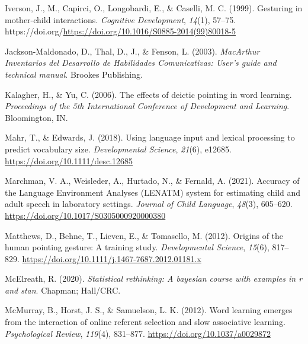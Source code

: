 \documentclass[
  man,floatsintext]{apa6}
\newlength{\cslhangindent}
\newlength{\cslentryspacingunit} %
\newenvironment{CSLReferences}[2] %
 {%
  \setlength{\parindent}{0pt}
  \ifodd #1
  \let\oldpar\par
  \def\par{\hangindent=\cslhangindent\oldpar}
  \fi
  \setlength{\parskip}{#2\cslentryspacingunit}
 }%
 {}
\begin{document}
\begin{CSLReferences}{1}{0}
\leavevmode{}%
Iverson, J., M., Capirci, O., Longobardi, E., \& Caselli, M. C. (1999). Gesturing in mother-child interactions. \emph{Cognitive Development}, \emph{14}(1), 57--75. https://doi.org/\url{https://doi.org/10.1016/S0885-2014(99)80018-5}

\leavevmode{}%
Jackson-Maldonado, D., Thal, D., J., \& Fenson, L. (2003). \emph{{MacArthur} {Inventarios} del {Desarrollo} de {Habilidades} {Comunicativas}: {User}'s guide and technical manual}. Brookes Publishing.

\leavevmode{}%
Kalagher, H., \& Yu, C. (2006). The effects of deictic pointing in word learning. \emph{Proceedings of the 5th {International} {Conference} of {Development} and {Learning}}. Bloomington, IN.

\leavevmode{}%
Mahr, T., \& Edwards, J. (2018). Using language input and lexical processing to predict vocabulary size. \emph{Developmental Science}, \emph{21}(6), e12685. \url{https://doi.org/10.1111/desc.12685}

\leavevmode{}%
Marchman, V. A., Weisleder, A., Hurtado, N., \& Fernald, A. (2021). Accuracy of the {Language} {Environment} {Analyses} ({LENATM}) system for estimating child and adult speech in laboratory settings. \emph{Journal of Child Language}, \emph{48}(3), 605--620. \url{https://doi.org/10.1017/S0305000920000380}

\leavevmode{}%
Matthews, D., Behne, T., Lieven, E., \& Tomasello, M. (2012). Origins of the human pointing gesture: A training study. \emph{Developmental Science}, \emph{15}(6), 817--829. \url{https://doi.org/10.1111/j.1467-7687.2012.01181.x}

\leavevmode{}%
McElreath, R. (2020). \emph{Statistical rethinking: A bayesian course with examples in r and stan}. Chapman; Hall/CRC.

\leavevmode{}%
McMurray, B., Horst, J. S., \& Samuelson, L. K. (2012). Word learning emerges from the interaction of online referent selection and slow associative learning. \emph{Psychological Review}, \emph{119}(4), 831--877. \url{https://doi.org/10.1037/a0029872}


\end{CSLReferences}
\end{document}
